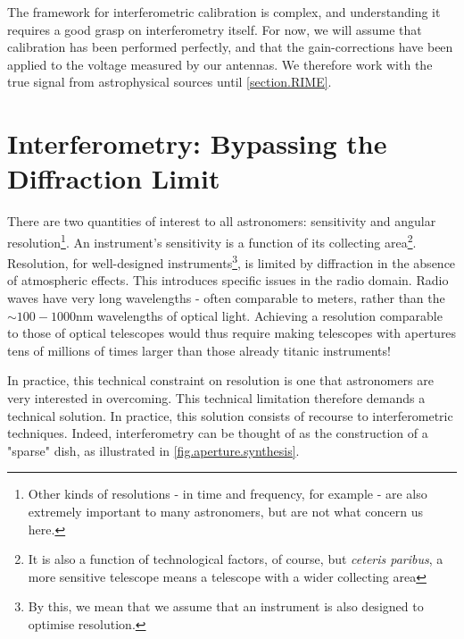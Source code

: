 \pg
The framework for interferometric calibration is complex, and understanding it requires a good grasp on interferometry itself. For now, we will assume that calibration has been performed perfectly, and that the gain-corrections have been applied to the voltage measured by our antennas. We therefore work with the true signal from astrophysical sources until \cref{section.RIME}.



\section{Interferometry: Bypassing the Diffraction Limit}

\pg
There are two quantities of interest to all astronomers: sensitivity and angular resolution\footnote{Other kinds of resolutions - in time and frequency, for example - are also extremely important to many astronomers, but are not what concern us here.}. An instrument's sensitivity is a function of its collecting area\footnote{It is also a function of technological factors, of course, but \emph{ceteris paribus}, a more sensitive telescope means a telescope with a wider collecting area}. Resolution, for well-designed instruments\footnote{By this, we mean that we assume that an instrument is also designed to optimise resolution.}, is limited by diffraction in the absence of atmospheric effects. This introduces specific issues in the radio domain. Radio waves have very long wavelengths - often comparable to meters, rather than the $\sim100-1000$nm wavelengths of optical light. Achieving a resolution comparable to those of optical telescopes would thus require making telescopes with apertures tens of millions of times larger than those already titanic instruments!

\pg
In practice, this technical constraint on resolution is one that astronomers are very interested in overcoming. This technical limitation therefore demands a technical solution. In practice, this solution consists of recourse to interferometric techniques. Indeed, interferometry can be thought of as the construction of a "sparse" dish, as illustrated in \cref{fig.aperture.synthesis}.

